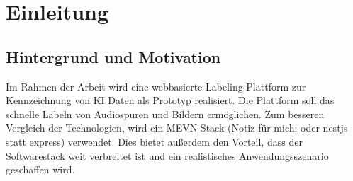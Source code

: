 \chapter{Einleitung}\label{sec:motivation}
\section{Hintergrund und Motivation}

Im Rahmen der Arbeit wird eine webbasierte Labeling-Plattform zur Kennzeichnung von KI Daten als Prototyp realisiert. Die Plattform soll das schnelle Labeln von Audiospuren und Bildern ermöglichen. Zum besseren Vergleich der Technologien, wird ein MEVN-Stack (Notiz für mich: oder nestjs statt express) verwendet. Dies bietet außerdem den Vorteil, dass der Softwarestack weit verbreitet ist und ein realistisches Anwendungsszenario geschaffen wird.
